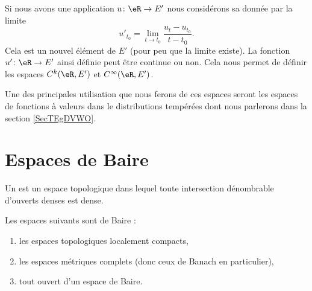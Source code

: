 \begin{definition}  \label{DefDZsypWu}
    Si nous avons une application \( u\colon \eR\to E'\) nous considérons sa  donnée par la limite
    \begin{equation}
        u'_{t_0}=\lim_{t\to t_0} \frac{ u_t-u_{t_0} }{ t-t_0 }.
    \end{equation}
    Cela est un nouvel élément de \( E'\) (pour peu que la limite existe). La fonction \( u'\colon \eR\to E'\) ainsi définie peut être continue ou non. Cela nous permet de définir les espaces \( C^k(\eR,E')\) et \( C^{\infty}(\eR,E')\).
\end{definition}
Une des principales utilisation que nous ferons de ces espaces seront les espaces de fonctions à valeurs dans le distributions tempérées dont nous parlerons dans la section \ref{SecTEgDVWO}.

\section{Espaces de Baire}
\label{SecBDlaUrz}

\begin{definition}
    Un  est un espace topologique dans lequel toute intersection dénombrable d'ouverts denses est dense.
\end{definition}

\begin{theorem}    \label{ThoBBIljNM}
    Les espaces suivants sont de Baire :
    \begin{enumerate}
        \item
            les espaces topologiques localement compacts,
        \item
            les espaces métriques complets (donc ceux de Banach en particulier),
        \item
            tout ouvert d'un espace de Baire.
    \end{enumerate}
\end{theorem}

